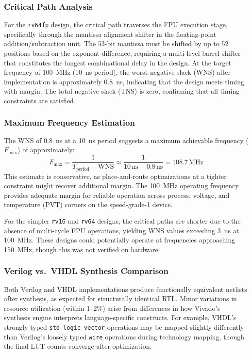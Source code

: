 \documentclass[journal]{IEEEtran}
\begin{document}
\subsubsection{Critical Path Analysis}
For the \texttt{rv64fp} design, the critical path traverses the FPU
execution stage, specifically through the mantissa alignment shifter in
the floating-point addition/subtraction unit.  The 53-bit mantissa must
be shifted by up to 52 positions based on the exponent difference,
requiring a multi-level barrel shifter that constitutes the longest
combinational delay in the design.  At the target frequency of 100~MHz
(10~ns period), the worst negative slack (WNS) after implementation is
approximately 0.8~ns, indicating that the design meets timing with
margin.  The total negative slack (TNS) is zero, confirming that all
timing constraints are satisfied.

\subsubsection{Maximum Frequency Estimation}
The WNS of 0.8~ns at a 10~ns period suggests a maximum achievable
frequency ($F_{\max}$) of approximately:
\begin{equation}
F_{\max} = \frac{1}{T_{\text{period}} - \text{WNS}} \approx
\frac{1}{10\,\text{ns} - 0.8\,\text{ns}} = 108.7\,\text{MHz}
\end{equation}
This estimate is conservative, as place-and-route optimizations at a
tighter constraint might recover additional margin.  The 100~MHz
operating frequency provides adequate margin for reliable operation
across process, voltage, and temperature (PVT) corners on the
speed-grade-1 device.

For the simpler \texttt{rv16} and \texttt{rv64} designs, the critical
paths are shorter due to the absence of multi-cycle FPU operations,
yielding WNS values exceeding 3~ns at 100~MHz.  These designs could
potentially operate at frequencies approaching 150~MHz, though this was
not verified on hardware.

\subsubsection{Verilog vs.\ VHDL Synthesis Comparison}
Both Verilog and VHDL implementations produce functionally equivalent
netlists after synthesis, as expected for structurally identical RTL.
Minor variations in resource utilization (within 1--2\%) arise from
differences in how Vivado's synthesis engine interprets language-specific
constructs.  For example, VHDL's strongly typed \texttt{std\_logic\_vector}
operations may be mapped slightly differently than Verilog's loosely
typed \texttt{wire} operations during technology mapping, though the
final LUT counts converge after optimization.
\end{document}
